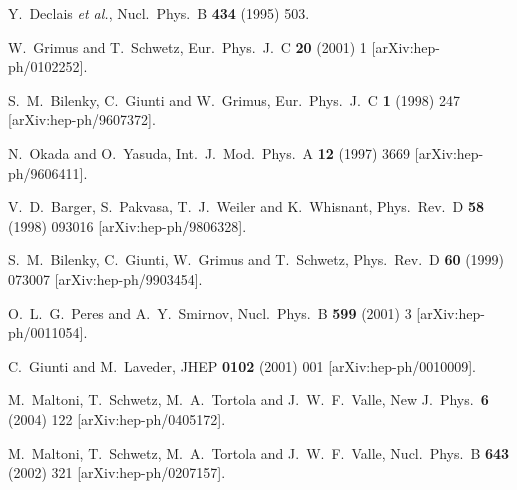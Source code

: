 \documentclass[12pt]{elsart}
\begin{document}
\begin{thebibliography}{99}
  Y.~Declais {\it et al.},
  Nucl.\ Phys.\  B {\bf 434} (1995) 503.

  W.~Grimus and T.~Schwetz,
  Eur.\ Phys.\ J.\  C {\bf 20} (2001) 1
  [arXiv:hep-ph/0102252].

  S.~M.~Bilenky, C.~Giunti and W.~Grimus,
  Eur.\ Phys.\ J.\  C {\bf 1} (1998) 247
  [arXiv:hep-ph/9607372].

  N.~Okada and O.~Yasuda,
  Int.\ J.\ Mod.\ Phys.\  A {\bf 12} (1997) 3669
  [arXiv:hep-ph/9606411].

  V.~D.~Barger, S.~Pakvasa, T.~J.~Weiler and K.~Whisnant,
  Phys.\ Rev.\  D {\bf 58} (1998) 093016
  [arXiv:hep-ph/9806328].

  S.~M.~Bilenky, C.~Giunti, W.~Grimus and T.~Schwetz,
  Phys.\ Rev.\  D {\bf 60} (1999) 073007
  [arXiv:hep-ph/9903454].

  O.~L.~G.~Peres and A.~Y.~Smirnov,
  Nucl.\ Phys.\  B {\bf 599} (2001) 3
  [arXiv:hep-ph/0011054].

  C.~Giunti and M.~Laveder,
  JHEP {\bf 0102} (2001) 001
  [arXiv:hep-ph/0010009].

  M.~Maltoni, T.~Schwetz, M.~A.~Tortola and J.~W.~F.~Valle,
  New J.\ Phys.\  {\bf 6} (2004) 122
  [arXiv:hep-ph/0405172].

  M.~Maltoni, T.~Schwetz, M.~A.~Tortola and J.~W.~F.~Valle,
  Nucl.\ Phys.\  B {\bf 643} (2002) 321
  [arXiv:hep-ph/0207157].


\end{thebibliography}
\end{document}
